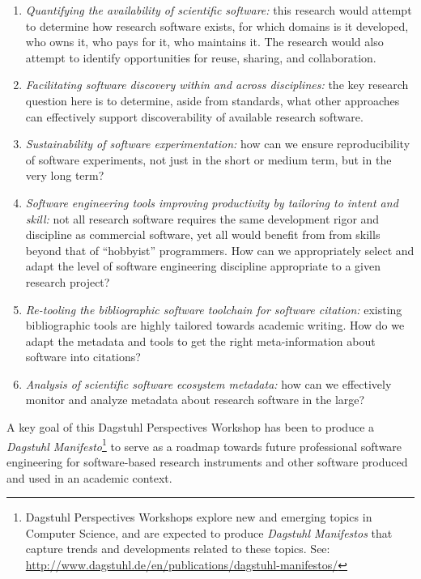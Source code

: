 \documentclass[a4paper,UKenglish]{dagrep}
\begin{document}
\begin{enumerate}
\item \emph{Quantifying the availability of scientific software:} this research would attempt to determine how research software exists, for which domains is it developed, who owns it, who pays for it, who maintains it. The research would also attempt to identify opportunities for reuse, sharing, and collaboration.

\item \emph{Facilitating software discovery within and across disciplines:} the key research question here is to determine, aside from standards, what other approaches can effectively support discoverability of available research software.

\item \emph{Sustainability of software experimentation:} how can we ensure reproducibility of software experiments, not just in the short or medium term, but in the very long term?

\item \emph{Software engineering tools improving productivity by tailoring to intent and skill:} not all research software requires the same development rigor and discipline as commercial software, yet all would benefit from from skills beyond that of ``hobbyist'' programmers. How can we appropriately select and adapt the level of software engineering discipline appropriate to a given research project?

\item \emph{Re-tooling the bibliographic software toolchain for software citation:} existing bibliographic tools are highly tailored towards academic writing. How do we adapt the metadata and tools to get the right meta-information about software into citations?

\item \emph{Analysis of scientific software ecosystem metadata:} how can we effectively monitor and analyze metadata about research software in the large?

\end{enumerate}



A key goal of this Dagstuhl Perspectives Workshop has been to produce a \emph{Dagstuhl Manifesto}\footnote{Dagstuhl Perspectives Workshops explore new and emerging topics in Computer Science, and are expected to produce \emph{Dagstuhl Manifestos} that capture trends and developments related to these topics. See: \url{http://www.dagstuhl.de/en/publications/dagstuhl-manifestos/}} to serve as a roadmap towards future professional software engineering for software-based research instruments and other software produced and used in an academic context.
\end{document}
